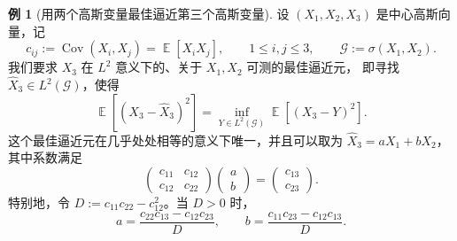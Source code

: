 \documentclass[UTF8,11pt,a4paper,oneside,fontset=fandol]{ctexrep}
\numberwithin{equation}{section}
\theoremstyle{plain}
\theoremstyle{definition}
\newtheorem{example}[theorem]{例}
\theoremstyle{remark}
\DeclareMathOperator{\E}{\mathbb{E}}
\DeclareMathOperator{\Cov}{Cov}
\begin{document}
\begin{samepage}
\begin{example}[用两个高斯变量最佳逼近第三个高斯变量]
\label{ex:gaussian-best-l2-approximation}
设 $(X_1,X_2,X_3)$ 是中心高斯向量，记
\[
  c_{ij}:=\Cov(X_i,X_j)=\E[X_iX_j],\qquad 1\le i,j\le3,
  \qquad\mathcal G:=\sigma(X_1,X_2).
\]
我们要求 $X_3$ 在 $L^2$ 意义下的、关于 $X_1,X_2$ 可测的最佳逼近元，
即寻找 $\widehat X_3\in L^2(\mathcal G)$，使得
\[
  \E[(X_3-\widehat X_3)^2]
  =\inf_{Y\in L^2(\mathcal G)}\E[(X_3-Y)^2].
\]
这个最佳逼近元在几乎处处相等的意义下唯一，并且可以取为
$\widehat X_3=aX_1+bX_2$，其中系数满足
\begin{equation}
  \label{eq:gaussian-regression-normal-equations}
  \begin{pmatrix}c_{11}&c_{12}\\c_{12}&c_{22}\end{pmatrix}
  \begin{pmatrix}a\\b\end{pmatrix}
  =\begin{pmatrix}c_{13}\\c_{23}\end{pmatrix}.
\end{equation}
特别地，令 $D:=c_{11}c_{22}-c_{12}^2$。当 $D>0$ 时，
\begin{equation}
  \label{eq:gaussian-regression-coefficients}
  a=\frac{c_{22}c_{13}-c_{12}c_{23}}{D},\qquad
  b=\frac{c_{11}c_{23}-c_{12}c_{13}}{D}.
\end{equation}
\end{example}
\end{samepage}
\end{document}
